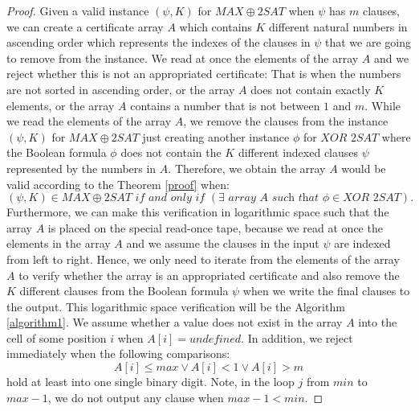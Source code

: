 \documentclass[a4paper,UKenglish,cleveref, autoref]{lipics-v2019}
\begin{document}
\begin{proof}
Given a valid instance $(\psi, K)$ for $MAX\oplus2SAT$ when $\psi$ has $m$ clauses, we can create a certificate array $A$ which contains $K$ different natural numbers in ascending order which represents the indexes of the clauses in $\psi$ that we are going to remove from the instance. We read at once the elements of the array $A$ and we reject whether this is not an appropriated certificate: That is when the numbers are not sorted in ascending order, or the array $A$ does not contain exactly $K$ elements, or the array $A$ contains a number that is not between $1$ and $m$. While we read the elements of the array $A$, we remove the clauses from the instance $(\psi, K)$ for $MAX\oplus2SAT$ just creating another instance $\phi$ for $\textit{XOR 2SAT}$ where the Boolean formula $\phi$ does not contain the $K$ different indexed clauses $\psi$ represented by the numbers in $A$. Therefore, we obtain the array $A$ would be valid according to the Theorem \ref{proof} when:
\[(\psi, K) \in MAX\oplus2SAT \textit{ if and only if } (\exists \textit{ array } A \textit{ such that } \phi \in \textit{XOR 2SAT}).\]
Furthermore, we can make this verification in logarithmic space such that the array $A$ is placed on the special read-once tape, because we read at once the elements in the array $A$ and we assume the clauses in the input $\psi$ are indexed from left to right. Hence, we only need to iterate from the elements of the array $A$ to verify whether the array is an appropriated certificate and also remove the $K$ different clauses from the Boolean formula $\psi$ when we write the final clauses to the output. This logarithmic space verification will be the Algorithm \ref{algorithm1}. We assume whether a value does not exist in the array $A$ into the cell of some position $i$ when $A[i] = \textit{undefined}$. In addition, we reject immediately when the following comparisons:
\[A[i] \leq max \vee A[i] < 1 \vee A[i] > m\]
hold at least into one single binary digit. Note, in the loop $j$ from $min$ to $max - 1$, we do not output any clause when $max - 1 < min$.


\end{proof}
\end{document}
